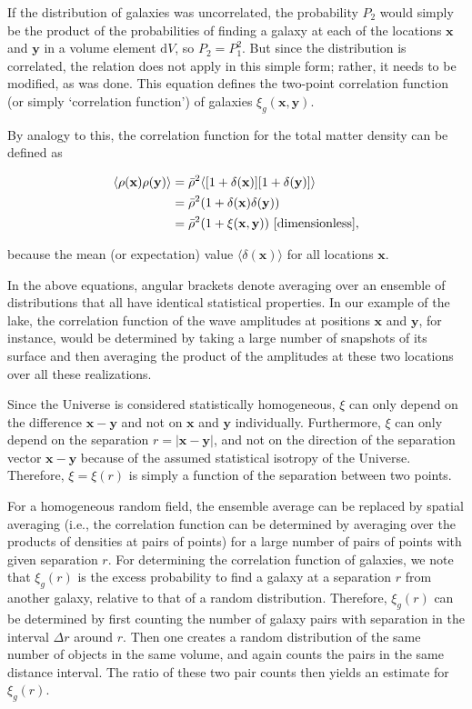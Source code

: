 \documentclass[a4paper,11pt]{article}
\begin{document}
{\noindent}If the distribution of galaxies was uncorrelated, the probability $P_2$ would simply be the product of the probabilities of finding a galaxy at each of the locations $\mathbf{x}$ and $\mathbf{y}$ in a volume element $\mathrm{d}V$, so $P_2=P_1^2$. But since the distribution is correlated, the relation does not apply in this simple form; rather, it needs to be modified, as was done. This equation defines the two-point correlation function (or simply `correlation function') of galaxies $\xi_g(\mathbf{x},\mathbf{y})$.

{\noindent}By analogy to this, the correlation function for the total matter density can be defined as

\begin{align*}
    \langle\rho(\mathbf{x})\rho(\mathbf{y})\rangle &= \bar{\rho}^2\langle[1+\delta(\mathbf{x})][1+\delta(\mathbf{y})]\rangle \\
    &= \bar{\rho}^2 (1+\delta(\mathbf{x})\delta(\mathbf{y})) \\
    &= \bar{\rho}^2(1+\xi(\mathbf{x},\mathbf{y})) ~ [{\rm dimensionless}],
\end{align*}

{\noindent}because the mean (or expectation) value $\langle\delta(\mathbf{x})\rangle$ for all locations $\mathbf{x}$.

{\noindent}In the above equations, angular brackets denote averaging over an ensemble of distributions that all have identical statistical properties. In our example of the lake, the correlation function of the wave amplitudes at positions $\mathbf{x}$ and $\mathbf{y}$, for instance, would be determined by taking a large number of snapshots of its surface and then averaging the product of the amplitudes at these two locations over all these realizations.

{\noindent}Since the Universe is considered statistically homogeneous, $\xi$ can only depend on the difference $\mathbf{x}-\mathbf{y}$ and not on $\mathbf{x}$ and $\mathbf{y}$ individually. Furthermore, $\xi$ can only depend on the separation $r=\lvert\mathbf{x}-\mathbf{y}\rvert$, and not on the direction of the separation vector $\mathbf{x}-\mathbf{y}$ because of the assumed statistical isotropy of the Universe. Therefore, $\xi=\xi(r)$ is simply a function of the separation between two points.

{\noindent}For a homogeneous random field, the ensemble average can be replaced by spatial averaging (i.e., the correlation function can be determined by averaging over the products of densities at pairs of points) for a large number of pairs of points with given separation $r$. For determining the correlation function of galaxies, we note that $\xi_g(r)$ is the excess probability to find a galaxy at a separation $r$ from another galaxy, relative to that of a random distribution. Therefore, $\xi_g(r)$ can be determined by first counting the number of galaxy pairs with separation in the interval $\Delta r$ around $r$. Then one creates a random distribution of the same number of objects in the same volume, and again counts the pairs in the same distance interval. The ratio of these two pair counts then yields an estimate for $\xi_g(r)$.
\end{document}
